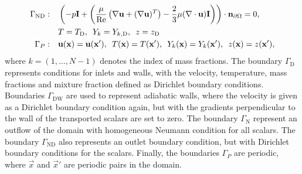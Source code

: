\begin{subequations}
\begin{align}
		\Gamma_{\text{ND}}:\quad
		 & \left( -p \mathbf{I}	+ \left(\frac{\mu}{\text{Re}} \left(\nabla \textbf{u} + (\nabla \textbf{u})^T\right) - \frac{2}{3}\mu(\nabla \cdot \textbf{u})\mathbf{I}\right)\right)\cdot  \textbf{n}_{\partial \Omega} 	= 0,
		\,\,\,\notag                                                                                                                                                                                                \\
		 & T = T_{\text{D}},
		\,\,\,
		Y_{k} =  Y_{k,{\text{D}}},
		\,\,\,
		z = z_{\text{D}}
		\label{eq:bc_OD}                                                                                                                                                                                            \\
		\Gamma_{P}:\quad
		 & \textbf{u}(\textbf{x}) = \textbf{u}(\textbf{x}'),
		\,\,\,
		T(\textbf{x}) = T(\textbf{x}'),
		\,\,\,
		Y_{k}(\textbf{x}) =  Y_{k}(\textbf{x}'),
		\,\,\,
		z(\textbf{x}) = z(\textbf{x}'),
		\label{eq:bc_P}
	\end{align}
\end{subequations}
where $k = (1,\dots,N-1)$ denotes the index of mass fractions. The boundary $\Gamma_\text{D}$ represents conditions for inlets and walls, with the velocity, temperature, mass fractions and mixture fraction defined as Dirichlet boundary conditions. Boundaries $\Gamma_\text{DW}$  are used to represent adiabatic walls, where the velocity is given as a Dirichlet boundary condition again, but with the gradients perpendicular to the wall of the transported scalars are set to zero. The boundary $\Gamma_\text{N}$ represent an outflow of the domain with homogeneous Neumann condition for all scalars. The boundary $\Gamma_{\text{ND}}$ also  represents an outlet boundary condition, but with Dirichlet boundary conditions for the scalars. Finally, the boundaries $\Gamma_P$ are periodic, where $\vec{x}$ and $\vec{x}'$ are periodic pairs in the domain.